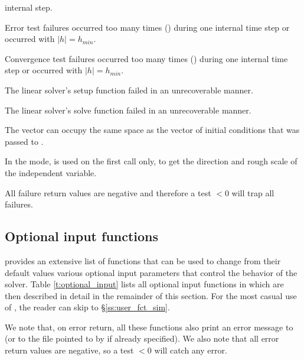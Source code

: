 {\begin{args}
    internal step.
  \item[\Id{CV\_ERR\_FAILURE}]
    Error test failures occurred too many times () during one 
    internal time step or occurred with $|h| = h_{min}$.
  \item[\Id{CV\_CONV\_FAILURE}] 
    Convergence test failures occurred too many times () during 
    one internal time step or occurred with $|h| = h_{min}$.             
  \item[\Id{CV\_LSETUP\_FAIL}] 
    The linear solver's setup function failed in an unrecoverable manner.
  \item[\Id{CV\_LSOLVE\_FAIL}] 
    The linear solver's solve function failed in an unrecoverable manner.
  \end{args} 
}
{
  The vector  can occupy the same space as the  vector of 
  initial conditions that was passed to . 

  In the  mode,  is used on the first call only, 
  to get the direction and rough scale of the independent variable.

  All failure return values are negative and therefore a test $< 0$
  will trap all  failures.
}

\subsection{Optional input functions}\label{ss:optional_input}

{\cvode} provides an extensive list of functions that can be used to change
from their default values various optional input parameters that control the
behavior of the {\cvode} solver. 
Table \ref{t:optional_input} lists all optional input functions in {\cvode} which 
are then described in detail in the remainder of this section.
For the most casual use of {\cvode}, the reader can skip to \S\ref{ss:user_fct_sim}.

We note that, on error return, all these functions also print an error message
to  (or to the file pointed to by  if already specified).
We also note that all error return values are negative, so a test $<0$
will catch any error.

